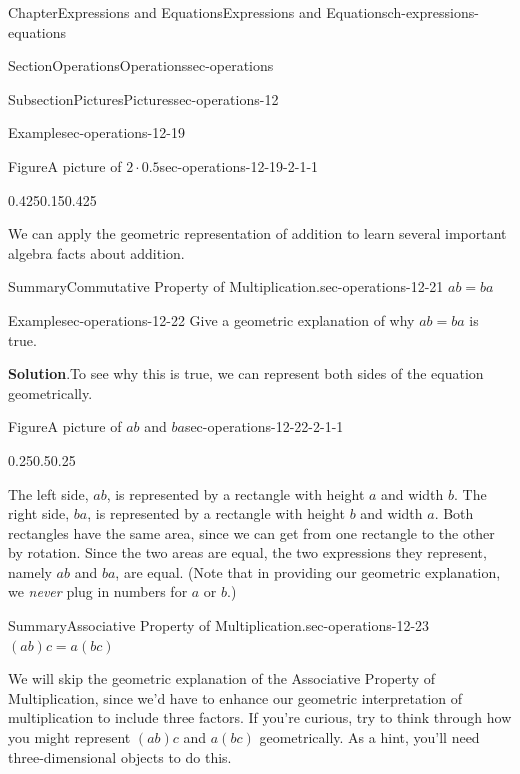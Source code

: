 \documentclass[twoside,11pt,]{book}
\newcommand{\blocktitlefont}{\relax}
\numberwithin{equation}{chapter}
\begin{document}
\begin{chapterptx}{Chapter}{Expressions and Equations}{}{Expressions and Equations}{}{}{ch-expressions-equations}
\begin{sectionptx}{Section}{Operations}{}{Operations}{}{}{sec-operations}
\begin{subsectionptx}{Subsection}{Pictures}{}{Pictures}{}{}{sec-operations-12}
\begin{example}{Example}{}{sec-operations-12-19}
\begin{figureptx}{Figure}{A picture of \(2 \cdot 0.5\)}{sec-operations-12-19-2-1-1}{}
\begin{image}{0.425}{0.15}{0.425}{}
{%
}%
\end{image}%
\tcblower
\end{figureptx}%
%
\end{example}
We can apply the geometric representation of addition to learn several important algebra facts about addition.%
\begin{assemblage}{Summary}{Commutative Property of Multiplication.}{sec-operations-12-21}%
\(ab = ba\)%
\end{assemblage}
\begin{example}{Example}{}{sec-operations-12-22}%
Give a geometric explanation of why \(ab = ba\) is true.%
\par\smallskip%
\noindent\textbf{\blocktitlefont Solution}.\hypertarget{sec-operations-12-22-2}{}\quad{}To see why this is true, we can represent both sides of the equation geometrically. \begin{figureptx}{Figure}{A picture of \(ab\) and \(ba\)}{sec-operations-12-22-2-1-1}{}%
\begin{image}{0.25}{0.5}{0.25}{}%
%
\end{image}%
\tcblower
\end{figureptx}%
 The left side, \(ab\), is represented by a rectangle with height \(a\) and width \(b\). The right side, \(ba\), is represented by a rectangle with height \(b\) and width \(a\). Both rectangles have the same area, since we can get from one rectangle to the other by rotation. Since the two areas are equal, the two expressions they represent, namely \(ab\) and \(ba\), are equal. (Note that in providing our geometric explanation, we \emph{never} plug in numbers for \(a\) or \(b\).)%
\end{example}
\begin{assemblage}{Summary}{Associative Property of Multiplication.}{sec-operations-12-23}%
\((ab)c = a(bc)\)%
\end{assemblage}
We will skip the geometric explanation of the Associative Property of Multiplication, since we'd have to enhance our geometric interpretation of multiplication to include three factors. If you're curious, try to think through how you might represent \((ab)c\) and \(a(bc)\) geometrically. As a hint, you'll need three-dimensional objects to do this.%

\end{subsectionptx}
\end{sectionptx}
\end{chapterptx}
\end{document}
